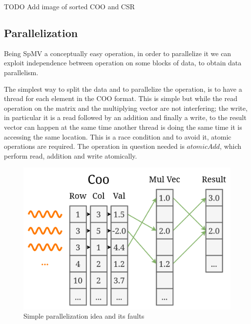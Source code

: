 \documentclass[conference]{IEEEtran}
\newcommand{\todo}[1]{\color{red} TODO #1\color{black}}
\begin{document}
\todo{Add image of sorted COO and CSR}

\subsection{Parallelization}
Being SpMV a conceptually easy operation, in order to parallelize it we can exploit independence between operation on some blocks of data, to obtain data parallelism.

The simplest way to split the data and to parallelize the operation, is to have a thread for each element in the COO format. This is simple but while the read operation on the matrix and the multiplying vector are not interfering; the write, in particular it is a read followed by an addition and finally a write, to the result vector can happen at the same time another thread is doing the same time it is accessing the same location. This is a race condition and to avoid it, atomic operations are required. The operation in question needed is $atomicAdd$, which perform read, addition and write atomically.

\begin{figure}[h!]
	\centering
	\includegraphics[width=0.7\linewidth]{other_img/diagram-threads}
	\caption{Simple parallelization idea and its faults}
	\label{fig:diagram-threads}
\end{figure}
\end{document}
